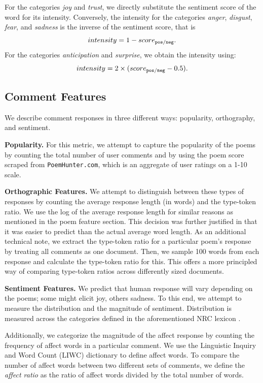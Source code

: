 \documentclass[11pt]{article}
\newcommand{\slimparagraph}[1]{
\vspace{4pt} %
\textbf{#1.}\quad}
\begin{document}
For the categories \emph{joy} and \emph{trust}, we directly substitute the sentiment score of the word for its intensity. Conversely, the intensity for the categories \emph{anger},
\emph{disgust},
\emph{fear}, and
\emph{sadness} is the inverse of the sentiment score, that is
$$intensity = 1 - score_{\tt pos/neg}.$$
For the categories \emph{anticipation} and \emph{surprise}, we obtain the intensity using:
$$intensity = 2 \times ( score_{\tt pos/neg} - 0.5 ).$$


\subsection{Comment Features}
We describe comment responses in three different ways: popularity, orthography, and sentiment.

\slimparagraph{Popularity}
For this metric, we attempt to capture the popularity of the poems by counting the total number of user comments and by using the poem score scraped from \texttt{PoemHunter.com}, which is an aggregate of user ratings on a 1-10 scale.

\slimparagraph{Orthographic Features}
We attempt to distinguish between these types of responses by counting the average response length (in words) and the type-token ratio. We use the log of the average response length for similar reasons as mentioned in the poem feature section. This decision was further justified in that it was easier to predict than the actual average word length. As an additional technical note, we extract the type-token ratio for a particular poem's response by treating all comments as one document. Then, we sample 100 words from each response and calculate the type-token ratio for this. This offers a more principled way of comparing type-token ratios across differently sized documents.

\slimparagraph{Sentiment Features}
We predict that human response will vary depending on the poems; some might elicit joy, others sadness. To this end, we attempt to measure the distribution and the magnitude of sentiment. Distribution is measured across the categories defined in the aforementioned NRC lexicon \cite{mohammad2010emotions}.

Additionally, we categorize the magnitude of the affect response by counting the frequency of affect words in a particular comment. We use the Linguistic Inquiry and Word Count (LIWC) dictionary \cite{pennebaker2001linguistic} to define affect words. To compare the number of affect words between two different sets of comments, we define the \emph{affect ratio} as the ratio of affect words divided by the total number of words.
\end{document}
